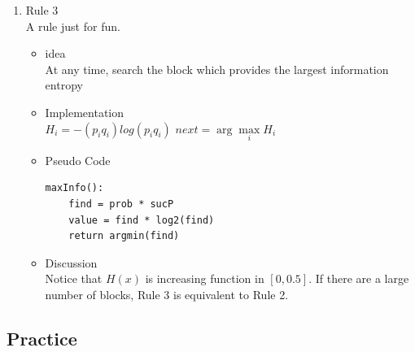 \documentclass[letter]{article}
\begin{document}
\begin{enumerate}
	\item {Rule 3} \\
	A rule just for fun.
	\begin{itemize}
		\item {idea} \\
		At any time, search the block which provides the largest information entropy
		\item {Implementation} \\
		$H_i = -(p_iq_i)log(p_iq_i)$ $next = \arg\max\limits_i H_i$
		\item {Pseudo Code} 
		\begin{lstlisting}
maxInfo():
	find = prob * sucP
	value = find * log2(find)
	return argmin(find)
		\end{lstlisting}
		\item {Discussion} \\
		Notice that $H(x)$ is increasing function in $[0, 0.5]$. If there are a large number of blocks, Rule 3 is equivalent to Rule 2.
	\end{itemize}
\end{enumerate}


\subsection{Practice}
\label{sec:1-practice}
\end{document}
